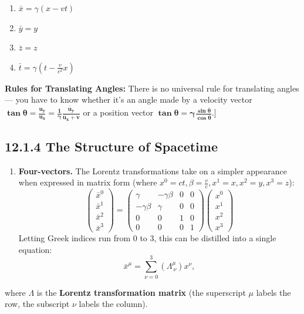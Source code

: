 \documentclass[12pt]{book}
\begin{document}
\begin{enumerate}
    \item $\bar{x} = \gamma (x - vt)$
    \item $\bar{y} = y$
    \item $\bar{z} = z$
    \item $\bar{t} = \gamma \left( t - \frac{v}{c^2} x \right)$
\end{enumerate}

\textbf{Rules for Translating Angles:} There is no universal rule for translating angles — you have to know whether it’s an angle made by a velocity vector $\mathbf{\tan{\theta}=\frac{u_y}{u_x}=\frac{1}{\gamma}\frac{\bar{u}_y}{\bar{u}_x+v}}$ or a position vector $\mathbf{\tan{\theta}=\gamma\frac{\sin{\bar{\theta}}}{\cos{\bar{\theta}}}}$.]

\subsection{\textbf{12.1.4 The Structure of Spacetime}}
\begin{enumerate}
    \item \textbf{Four-vectors.} The Lorentz transformations take on a simpler appearance when expressed in matrix form (where $x^0=ct, \beta = \frac{v}{c}, x^1=x, x^2=y, x^3=z$): 
    \[
    \begin{pmatrix}
    \bar{x}^0 \\
    \bar{x}^1 \\
    \bar{x}^2 \\
    \bar{x}^3
    \end{pmatrix}
    =
    \begin{pmatrix}
    \gamma & -\gamma\beta & 0 & 0 \\
    -\gamma\beta & \gamma & 0 & 0 \\
    0 & 0 & 1 & 0 \\
    0 & 0 & 0 & 1
    \end{pmatrix}
    \begin{pmatrix}
    x^0 \\
    x^1 \\
    x^2 \\
    x^3
    \end{pmatrix}
    \]   
    Letting Greek indices run from 0 to 3, this can be distilled into a single equation:
    \[
    \bar{x}^\mu = \sum_{\nu=0}^{3} (\Lambda^\mu_{\ \nu}) x^\nu,
    \]
\end{enumerate}
where $\Lambda$ is the \textbf{Lorentz transformation matrix} (the superscript $\mu$ labels the row, the subscript $\nu$ labels the column). \\
\end{document}
